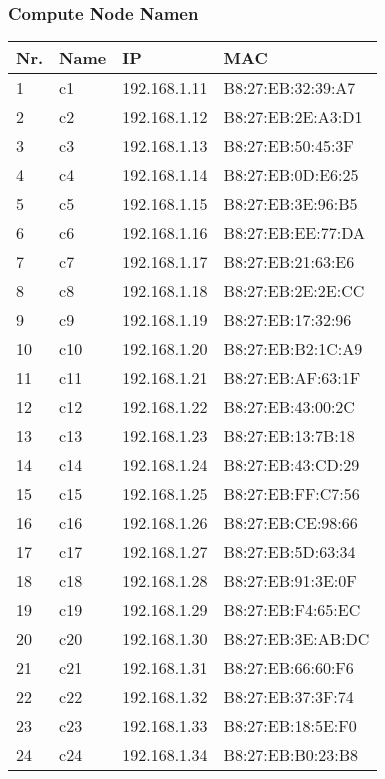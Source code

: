 \subsubsection{Compute Node Namen}
\begin{table}[H]
\centering
\begin{tabular}{p{1cm}p{2cm}p{6cm}p{6cm}}
\hline
\rowcolor{heading} \textbf{Nr.} & \textbf{Name} & \textbf{IP} & \textbf{MAC} \\\hline
1 & c1 & 192.168.1.11 & B8:27:EB:32:39:A7\\\hline
2 & c2 & 192.168.1.12 & B8:27:EB:2E:A3:D1\\\hline
3 & c3 & 192.168.1.13 & B8:27:EB:50:45:3F\\\hline
4 & c4 & 192.168.1.14 & B8:27:EB:0D:E6:25\\\hline
5 & c5 & 192.168.1.15 & B8:27:EB:3E:96:B5\\\hline
6 & c6 & 192.168.1.16 & B8:27:EB:EE:77:DA\\\hline
7 & c7 & 192.168.1.17 & B8:27:EB:21:63:E6\\\hline
8 & c8 & 192.168.1.18 & B8:27:EB:2E:2E:CC\\\hline
9 & c9 & 192.168.1.19 & B8:27:EB:17:32:96\\\hline
10 & c10 & 192.168.1.20 & B8:27:EB:B2:1C:A9\\\hline
11 & c11 & 192.168.1.21 & B8:27:EB:AF:63:1F\\\hline
12 & c12 & 192.168.1.22 & B8:27:EB:43:00:2C\\\hline
13 & c13 & 192.168.1.23 & B8:27:EB:13:7B:18\\\hline
14 & c14 & 192.168.1.24 & B8:27:EB:43:CD:29\\\hline
15 & c15 & 192.168.1.25 & B8:27:EB:FF:C7:56\\\hline
16 & c16 & 192.168.1.26 & B8:27:EB:CE:98:66\\\hline
17 & c17 & 192.168.1.27 & B8:27:EB:5D:63:34\\\hline
18 & c18 & 192.168.1.28 & B8:27:EB:91:3E:0F\\\hline
19 & c19 & 192.168.1.29 & B8:27:EB:F4:65:EC\\\hline
20 & c20 & 192.168.1.30 & B8:27:EB:3E:AB:DC\\\hline
21 & c21 & 192.168.1.31 & B8:27:EB:66:60:F6\\\hline
22 & c22 & 192.168.1.32 & B8:27:EB:37:3F:74\\\hline
23 & c23 & 192.168.1.33 & B8:27:EB:18:5E:F0\\\hline
24 & c24 & 192.168.1.34 & B8:27:EB:B0:23:B8\\\hline

\end{tabular}
\end{table}
